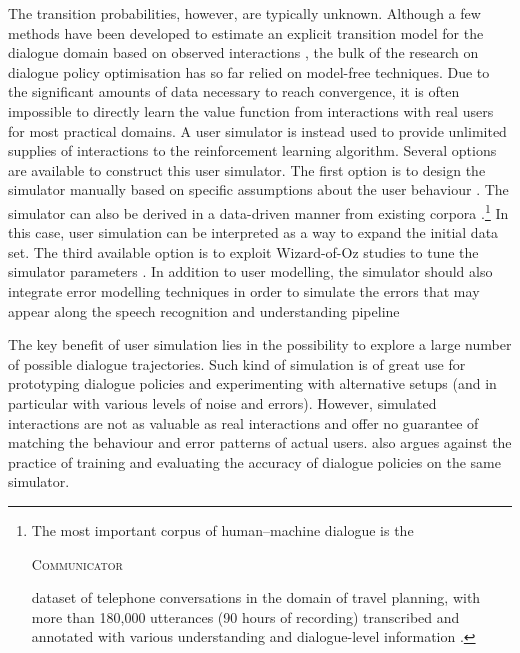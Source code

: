 The transition probabilities, however, are typically unknown.  Although a few methods have been developed to estimate an explicit transition model for the dialogue domain based on observed interactions \citep{SinghLKW02,tetreault2006using},  the bulk of the research on dialogue policy optimisation has so far relied on model-free techniques. Due to the significant amounts of data necessary to reach convergence, it is often impossible to directly learn the value function from interactions with real users for most practical domains.  A user simulator is instead used to provide unlimited supplies of interactions to the reinforcement learning algorithm.   Several options are available to construct this user simulator.  The first option is to design the simulator manually based on specific assumptions about the user behaviour \citep{Pietquin:2006,Schatzmann:2007:AUS:1614108.1614146}.  The simulator can also be derived in a data-driven manner from existing corpora \citep{GeorgilaHL06}.\footnote{The most important corpus of human--machine dialogue is the \begin{small}\textsc{Communicator}\end{small} dataset of telephone conversations in the domain of travel planning, with more than 180,000 utterances (90 hours of recording) transcribed and annotated with various understanding and dialogue-level information \citep{BennettR02}.}  In this case, user simulation can be interpreted as a way to expand the initial data set.  The third available option is to exploit  Wizard-of-Oz studies to tune the simulator parameters \citep{Rieser:2010:LHM:1735495.1735497}.  In addition to user modelling, the simulator should also integrate error modelling techniques in order to simulate the errors that may appear along the speech recognition and understanding pipeline \citep{SchatzmannTY07,ThomsonGHTY12}

The key benefit of user simulation lies in the possibility to explore a large number of possible dialogue trajectories.  Such kind of simulation is of great use for prototyping dialogue policies and experimenting with alternative setups (and in particular with various levels of noise and errors). However, simulated interactions are not as valuable as real interactions and offer no guarantee of matching the behaviour and error patterns of actual users.  \cite{paek2006} also argues against the practice of training and evaluating the accuracy of dialogue policies on the same simulator.

